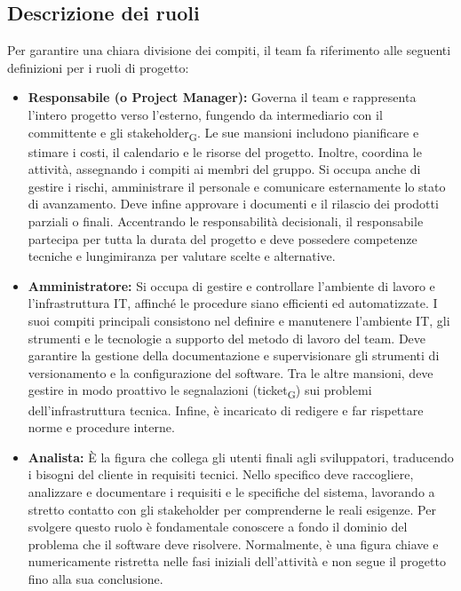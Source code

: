 \documentclass[11pt, a4paper]{article}
\begin{document}
	\subsection{Descrizione dei ruoli}
	Per garantire una chiara divisione dei compiti, il team fa riferimento alle seguenti definizioni per i ruoli di progetto:
	\begin{itemize}
		\item \textbf{Responsabile (o Project Manager):} Governa il team e rappresenta l'intero progetto verso l'esterno, fungendo da intermediario con il committente e gli stakeholder\textsubscript{G}. Le sue mansioni includono pianificare e stimare i costi, il calendario e le risorse del progetto. Inoltre, coordina le attività, assegnando i compiti ai membri del gruppo. Si occupa anche di gestire i rischi, amministrare il personale e comunicare esternamente lo stato di avanzamento. Deve infine approvare i documenti e il rilascio dei prodotti parziali o finali. Accentrando le responsabilità decisionali, il responsabile partecipa per tutta la durata del progetto e deve possedere competenze tecniche e lungimiranza per valutare scelte e alternative.
		
		\item \textbf{Amministratore:} Si occupa di gestire e controllare l'ambiente di lavoro e l'infrastruttura IT, affinché le procedure siano efficienti ed automatizzate. I suoi compiti principali consistono nel definire e manutenere l'ambiente IT, gli strumenti e le tecnologie a supporto del metodo di lavoro del team. Deve garantire la gestione della documentazione e supervisionare gli strumenti di versionamento e la configurazione del software. Tra le altre mansioni, deve gestire in modo proattivo le segnalazioni (ticket\textsubscript{G}) sui problemi dell'infrastruttura tecnica. Infine, è incaricato di redigere e far rispettare norme e procedure interne.
		
		\item \textbf{Analista:} È la figura che collega gli utenti finali agli sviluppatori, traducendo i bisogni del cliente in requisiti tecnici. Nello specifico deve raccogliere, analizzare e documentare i requisiti e le specifiche del sistema, lavorando a stretto contatto con gli stakeholder per comprenderne le reali esigenze. Per svolgere questo ruolo è fondamentale conoscere a fondo il dominio del problema che il software deve risolvere. Normalmente, è una figura chiave e numericamente ristretta nelle fasi iniziali dell'attività e non segue il progetto fino alla sua conclusione.
		

\end{itemize}
\end{document}
